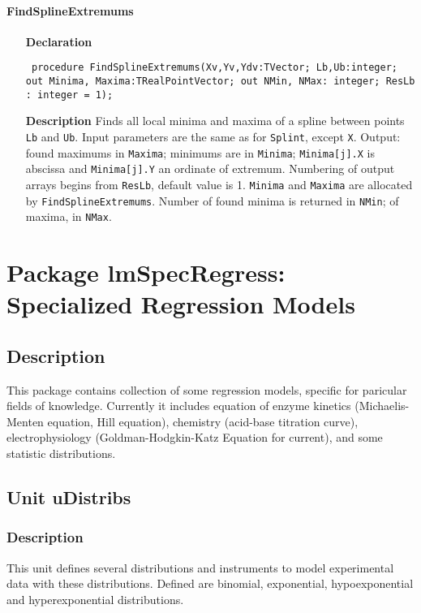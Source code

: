 \documentclass[12pt,a4paper,oneside]{report}
\newcommand{\lmath}[1]{   %
	\marginpar{\vspace{#1} 
		\begin{flushright}
			LMath
	\end{flushright} }
}
\newcommand{\declarationitem}[1]{\textbf{#1}}
\newcommand{\descriptiontitle}[1]{\textbf{#1}}
\newcommand{\code}[1]{\texttt{#1}}
\begin{document}
\subsubsection{FindSplineExtremums}
\label{uSpline-FindSplineExtremums}
\begin{itemize}\item[\declarationitem{Declaration}\hfill]
	\begin{flushleft}
		\code{
			procedure FindSplineExtremums(Xv,Yv,Ydv:TVector; Lb,Ub:integer; out Minima, Maxima:TRealPointVector; out NMin, NMax: integer; ResLb : integer = 1);}
		
	\end{flushleft}
	
	\par
	\item[\descriptiontitle{Description}]
	Finds all local minima and maxima of a spline between points \code{Lb} and \code{Ub}. Input parameters are the same as for \code{Splint}, except \code{X}. Output: found maximums in \code{Maxima}; minimums are in \code{Minima}; \code{Minima[j].X} is abscissa and \code{Minima[j].Y} an ordinate of extremum. Numbering of output arrays begins from \code{ResLb}, default value is 1. \code{Minima} and \code{Maxima} are allocated by \code{FindSplineExtremums}. Number of found minima is returned in \code{NMin}; of maxima, in \code{NMax}.
	
\end{itemize}


\chapter[Package lmSpecRegress]{Package lmSpecRegress: Specialized Regression Models}\label{package-lmSpecRegress}
\section{Description}
This package contains collection of some regression models, specific for paricular fields of knowledge. Currently it includes equation of enzyme kinetics (Michaelis-Menten equation, Hill equation), chemistry (acid-base titration curve), electrophysiology (Goldman-Hodgkin-Katz Equation for current), and some statistic distributions.
\section{Unit uDistribs}\lmath{-24pt}
\label{udistribs}
\subsection{Description}
This unit defines several distributions and instruments to model experimental data with these distributions. Defined are binomial, exponential, hypoexponential and hyperexponential distributions.
\end{document}
